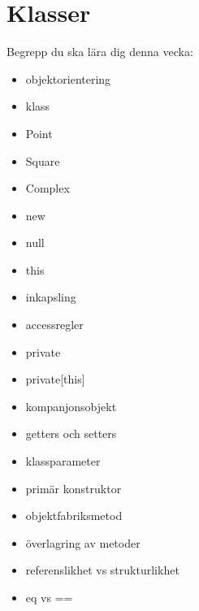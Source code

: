 \chapter{Klasser}\label{chapter:W06}
Begrepp du ska lära dig denna vecka:
\begin{multicols}{2}\begin{itemize}[nosep,label={$\square$},leftmargin=*]
\item objektorientering
\item klass
\item Point
\item Square
\item Complex
\item new
\item null
\item this
\item inkapsling
\item accessregler
\item private
\item private[this]
\item kompanjonsobjekt
\item getters och setters
\item klassparameter
\item primär konstruktor
\item objektfabriksmetod
\item överlagring av metoder
\item referenslikhet vs strukturlikhet
\item eq vs ==\end{itemize}\end{multicols}
